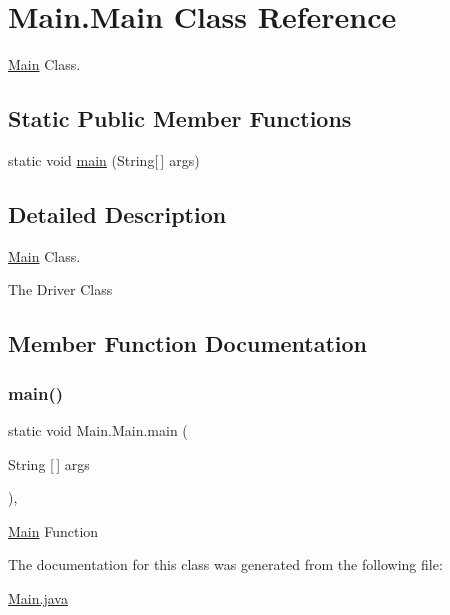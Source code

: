 \hypertarget{class_main_1_1_main}{}\section{Main.\+Main Class Reference}
\label{class_main_1_1_main}


\hyperlink{class_main_1_1_main}{Main} Class.  


\subsection*{Static Public Member Functions}
\begin{DoxyCompactItemize}
\item 
static void \hyperlink{class_main_1_1_main_a99de64146f6da3320d5a9958b8e4f62c}{main} (String\mbox{[}$\,$\mbox{]} args)
\end{DoxyCompactItemize}


\subsection{Detailed Description}
\hyperlink{class_main_1_1_main}{Main} Class. 

The Driver Class 

\subsection{Member Function Documentation}
\mbox{\label{class_main_1_1_main_a99de64146f6da3320d5a9958b8e4f62c}} 
\subsubsection{\texorpdfstring{main()}{main()}}
{\footnotesize\ttfamily static void Main.\+Main.\+main (\begin{DoxyParamCaption}\item[{String \mbox{[}$\,$\mbox{]}}]{args }\end{DoxyParamCaption})\hspace{0.3cm}{\ttfamily [inline]}, {\ttfamily [static]}}

\hyperlink{class_main_1_1_main}{Main} Function 

The documentation for this class was generated from the following file\+:\begin{DoxyCompactItemize}
\item 
\hyperlink{_main_8java}{Main.\+java}\end{DoxyCompactItemize}
